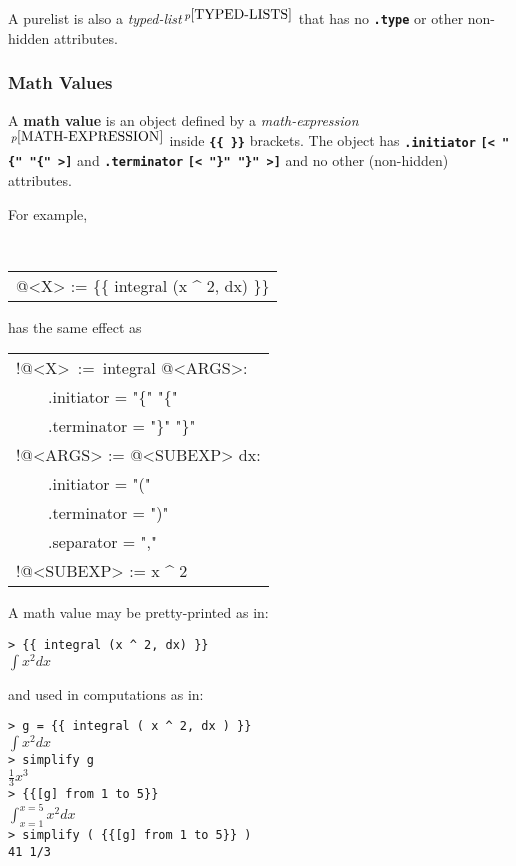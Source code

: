 \documentclass[12pt]{article}
\newcommand{\TT}[1]{{\tt \bfseries #1}}
\newcommand{\key}[1]{{\rm \bfseries #1}}
\newcommand{\pagnote}[1]{$\,^{p\pageref{#1}}$}
\newenvironment{indpar}[1][0.3in]%
	{\begin{list}{}%
		     {\setlength{\itemsep}{0in}%
		      \setlength{\topsep}{0in}%
		      \setlength{\parsep}{1ex}%
		      \setlength{\labelwidth}{#1}%
		      \setlength{\leftmargin}{#1}%
		      \addtolength{\leftmargin}{\labelsep}}%
	 \item}%
	{\end{list}}
\begin{document}
A purelist is also a {\em typed-list}\pagnote{TYPED-LISTS} that has
no \TT{.type} or other non-hidden attributes.

\subsubsection{Math Values}
\label{MATH-VALUES}

A \key{math value} is an object defined by a
{\em math-expression}\pagnote{MATH-EXPRESSION}
inside \TT{\{\{~\}\}} brackets.  The object has \TT{.initiator}
\TT{[< "\{" "\{" >]} and \TT{.terminator}
\TT{[< "\}" "\}" >]} and no other (non-hidden) attributes.

For example,
\begin{indpar}
\tt
\begin{tabular}{l}
@<X> := \{\{ integral (x \textasciicircum{} 2, dx) \}\}
\end{tabular}
\end{indpar}
{\rm has the same effect as}
\begin{indpar}
\begin{tabular}{l}
!@<X>~:=~integral @<ARGS>: \\
~~~~.initiator = "\{" "\{" \\
~~~~.terminator = "\}" "\}" \\
!@<ARGS> := @<SUBEXP> dx: \\
~~~~.initiator = "(" \\
~~~~.terminator = ")" \\
~~~~.separator = "," \\
!@<SUBEXP> := x \textasciicircum{} 2 \\
\end{tabular}
\end{indpar}

A math value may be pretty-printed as in:
\begin{indpar}
\verb/> {{ integral (x ^ 2, dx) }}/ \\
$\int x^2 dx$
\end{indpar}

and used in computations as in:
\begin{indpar}
\verb/> g = {{ integral ( x ^ 2, dx ) }}/ \\
$\int x^2 dx$ \\
\verb/> simplify g/ \\
$\frac{1}{3} x^3$ \\
\verb/> {{[g] from 1 to 5}}/ \\
$\int_{x = 1}^{x = 5} x^2 dx$ \\
\verb/> simplify ( {{[g] from 1 to 5}} )/ \\
\verb:41 1/3:
\end{indpar}
\end{document}
